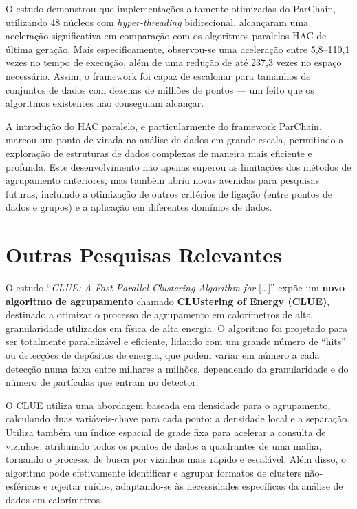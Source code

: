 \documentclass[12pt,
openright, 
oneside, %
a4paper,    %
brazil]{facom-ufu-abntex2}
\begin{document}
O estudo demonstrou que implementações altamente otimizadas do ParChain, utilizando 48 núcleos com \textit{hyper-threading} bidirecional, alcançaram uma aceleração significativa em comparação com os algoritmos paralelos HAC de última geração. Mais especificamente, observou-se uma aceleração entre 5,8--110,1 vezes no tempo de execução, além de uma redução de até 237,3 vezes no espaço necessário. Assim, o framework foi capaz de escalonar para tamanhos de conjuntos de dados com dezenas de milhões de pontos --- um feito que os algoritmos existentes não conseguiam alcançar.

A introdução do HAC paralelo, e particularmente do framework ParChain, marcou um ponto de virada na análise de dados em grande escala, permitindo a exploração de estruturas de dados complexas de maneira mais eficiente e profunda. Este desenvolvimento não apenas superou as limitações dos métodos de agrupamento anteriores, mas também abriu novas avenidas para pesquisas futuras, incluindo a otimização de outros critérios de ligação (entre pontos de dados e grupos) e a aplicação em diferentes domínios de dados.




\section{Outras Pesquisas Relevantes}

O estudo \enquote{\textit{CLUE: A Fast Parallel Clustering Algorithm for} [\dots]} \cite{clueParallelAlgo2020} expõe um \textbf{novo algoritmo de agrupamento} chamado \textbf{CLUstering of Energy (CLUE)}, destinado a otimizar o processo de agrupamento em calorímetros de alta granularidade utilizados em física de alta energia. O algoritmo foi projetado para ser totalmente paralelizável e eficiente, lidando com um grande número de \enquote{hits} ou detecções de depósitos de energia, que podem variar em número a cada detecção numa faixa entre milhares a milhões, dependendo da granularidade e do número de partículas que entram no detector.

O CLUE utiliza uma abordagem baseada em densidade para o agrupamento, calculando duas variáveis-chave para cada ponto: a densidade local e a separação. Utiliza também um índice espacial de grade fixa para acelerar a consulta de vizinhos, atribuindo todos os pontos de dados a quadrantes de uma malha, tornando o processo de busca por vizinhos mais rápido e escalável. Além disso, o algoritmo pode efetivamente identificar e agrupar formatos de clusters não-esféricos e rejeitar ruídos, adaptando-se às necessidades específicas da análise de dados em calorímetros.
\end{document}
